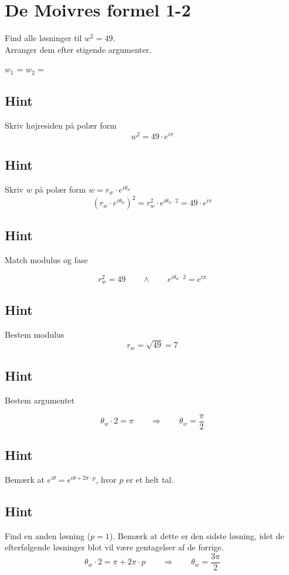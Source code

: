 \documentclass{article}
\newenvironment{exercise}[1]{\newpage\section{#1}}{}
\newcommand{\answerbox}[1]{\fbox{$#1$}}
\newcommand{\hint}{\subsection*{Hint}}
\begin{document}
\begin{exercise}{De Moivres formel 1-2}
	
	Find alle løsninger til $w^2=49$. \\
	Arranger dem efter stigende argumenter.
	
	$w_1$ = \answerbox{7 \cdot e^{i \frac{\pi}{2}}}		$w_2$ = \answerbox{7 \cdot e^{i \frac{3 \pi}{2}}}		
	
	
	\hint 
	
	Skriv højresiden på polær form
	\[
	w^2 = 49 \cdot e^{i \pi}
	\]
	
	
	\hint
	
	Skriv $w$ på polær form $w = r_w \cdot e^{i \theta_w}$
	\[
	\left(r_w \cdot e^{i \theta_w}\right)^2 = r_w^2 \cdot e^{i \theta_w \cdot 2} = 49 \cdot e^{i \pi}
	\]
	
	\hint 
	Match modulus og fase
	
	\[
	r_w^2 = 49 \qquad \wedge \qquad e^{i \theta_w \cdot 2} = e^{i \pi}
	\]
	
	\hint
	
	Bestem modulus
	\[
	r_w  =  \sqrt{49} = 7
	\]
	
	\hint
	
	Bestem argumentet
	
	\[
	\theta_w \cdot 2 = \pi \qquad \Rightarrow \qquad  \theta_w = \frac{\pi}{2}
	\]
	
	\hint
	
	Bemærk at $e^{i \theta} = e^{i \theta + 2 \pi \cdot p}$, hvor $p$ er et helt tal.
	
	\hint
	
	Find en anden løsning ($p=1$). Bemærk at dette er den sidste løsning, idet de efterfølgende løsninger blot vil være gentagelser af de forrige. 
	\[
	\theta_w \cdot 2 = \pi  + 2 \pi \cdot p \qquad \Rightarrow \qquad  \theta_w = \frac{3 \pi}{2}
	\]

	
\end{exercise}

\newpage
\end{document}
